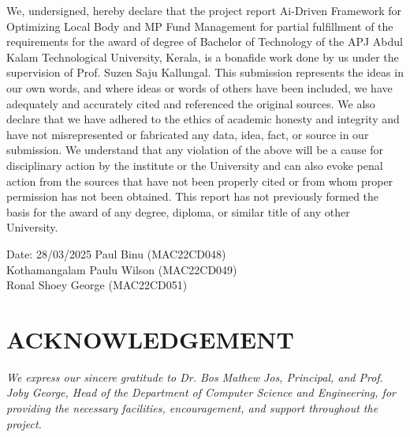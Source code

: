 \documentclass[12pt,a4paper]{report}
\begin{document}
We, undersigned, hereby declare that the project report Ai-Driven Framework for Optimizing Local Body and MP Fund Management for partial fulfillment of the requirements for the award of degree of Bachelor of Technology of the APJ Abdul Kalam Technological University, Kerala, is a bonafide work done by us under the supervision of Prof. Suzen Saju Kallungal. This submission represents the ideas in our own words, and where ideas or words of others have been included, we have adequately and accurately cited and referenced the original sources. We also declare that we have adhered to the ethics of academic honesty and integrity and have not misrepresented or fabricated any data, idea, fact, or source in our submission. We understand that any violation of the above will be a cause for disciplinary action by the institute or the University and can also evoke penal action from the sources that have not been properly cited or from whom proper permission has not been obtained. This report has not previously formed the basis for the award of any degree, diploma, or similar title of any other University.

\vspace{50pt}
\noindent Date: 28/03/2025 
\hfill  Paul Binu (MAC22CD048) \\ Kothamangalam
\hfill  Paulu Wilson (MAC22CD049) \\
\hspace*{\fill} Ronal Shoey George (MAC22CD051)
\thispagestyle{empty}
\clearpage




\setcounter{page}{1} %
\thispagestyle{plain}
\clearpage
{}

\chapter*{\centering\LARGE ACKNOWLEDGEMENT}


\textit{We express our sincere gratitude to Dr. Bos Mathew Jos, Principal, and Prof. Joby George, Head of the Department of Computer Science and Engineering, for providing the necessary facilities, encouragement, and support throughout the project.}
    
\end{document}
